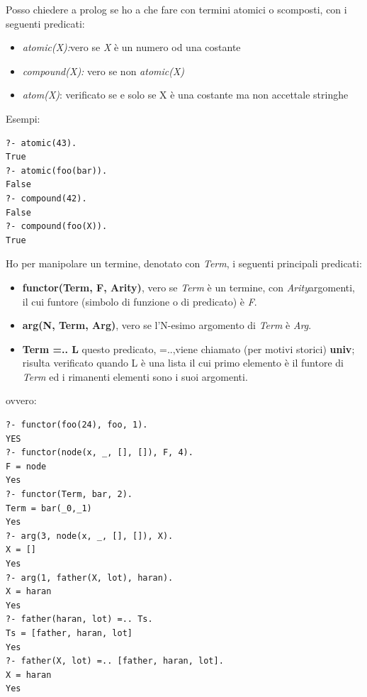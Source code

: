 \documentclass[a4paper]{book}
\begin{document}
Posso chiedere a prolog se ho a che fare con termini atomici o scomposti, con i seguenti predicati:
\begin{itemize}
\item \textit{atomic(X):}vero se \textit{X} è un numero od una costante
\item \textit{compound(X):} vero se non \textit{atomic(X)}
\item \textit{atom(X)}: verificato se e solo se X è una costante ma non accettale stringhe
\end{itemize}
Esempi:
\begin{verbatim}
?- atomic(43).
True
?- atomic(foo(bar)).
False
?- compound(42).
False
?- compound(foo(X)).
True
\end{verbatim}
Ho per manipolare un termine, denotato con \emph{Term}, i seguenti principali predicati:
\begin{itemize}
\item \textbf{functor(Term, F, Arity)},
vero se \emph{Term} è un termine, con \emph{Arity}argomenti, il cui funtore (simbolo di funzione o di predicato) è \emph{F}.
\item \textbf{arg(N, Term, Arg)},
vero se l’N-esimo argomento di \emph{Term }è \emph{Arg}.
\item \textbf{Term =.. L}
  questo predicato, =..,viene chiamato (per motivi storici) \textbf{univ}; risulta verificato quando L è una lista
  il cui primo elemento è il funtore di \textit{Term} ed i rimanenti elementi sono i suoi argomenti.
\end{itemize}
ovvero:
\begin{verbatim}
?- functor(foo(24), foo, 1).
YES
?- functor(node(x, _, [], []), F, 4).
F = node
Yes
?- functor(Term, bar, 2).
Term = bar(_0,_1)
Yes
?- arg(3, node(x, _, [], []), X).
X = []
Yes
?- arg(1, father(X, lot), haran).
X = haran
Yes
?- father(haran, lot) =.. Ts.
Ts = [father, haran, lot]
Yes
?- father(X, lot) =.. [father, haran, lot].
X = haran
Yes
\end{verbatim}
\end{document}
